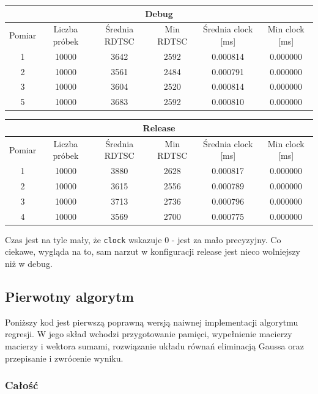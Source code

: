 \documentclass{article}
\begin{document}
	\begin{center}
		\begin{tabular}{|c|c|c|c|c|c|} \hline
			\multicolumn{6}{|c|}{Debug} \\\hline
			Pomiar  & Liczba próbek & Średnia RDTSC & Min RDTSC & Średnia clock [ms] & Min clock [ms] \\\hline
			\hline
			1 & 10000 & 3642 & 2592 & 0.000814 & 0.000000 \\\hline
			2 & 10000 & 3561 & 2484 & 0.000791 & 0.000000 \\\hline
			3 & 10000 & 3604 & 2520 & 0.000814 & 0.000000 \\\hline
			5 & 10000 & 3683 & 2592 & 0.000810 & 0.000000 \\\hline
			
		\end{tabular}
	\end{center}
	\begin{center}
		\begin{tabular}{|c|c|c|c|c|c|} \hline
			\multicolumn{6}{|c|}{Release} \\\hline
			Pomiar  & Liczba próbek & Średnia RDTSC & Min RDTSC & Średnia clock [ms] & Min clock [ms] \\\hline
			\hline
			1 & 10000 & 3880 & 2628 & 0.000817 & 0.000000 \\\hline
			2 & 10000 & 3615 & 2556 & 0.000789 & 0.000000 \\\hline
			3 & 10000 & 3713 & 2736 & 0.000796 & 0.000000 \\\hline
			4 & 10000 & 3569 & 2700 & 0.000775 & 0.000000 \\\hline
			
		\end{tabular}
	\end{center}
	Czas jest na tyle mały, że \verb|clock| wskazuje 0 - jest za mało precyzyjny.
	Co ciekawe, wygląda na to, sam narzut w konfiguracji release jest nieco wolniejszy niż w debug.
	
	\pagebreak
	
	\subsection{Pierwotny algorytm}
	Poniższy kod jest pierwszą poprawną wersją naiwnej implementacji algorytmu regresji. W jego skład wchodzi przygotowanie pamięci, wypełnienie macierzy macierzy i wektora sumami, rozwiązanie układu równań eliminacją Gaussa oraz przepisanie i zwrócenie wyniku.
	\subsubsection{Całość}
\end{document}
